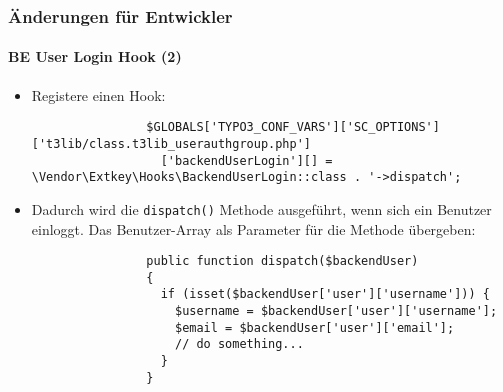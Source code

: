 \begin{frame}[fragile]
	\frametitle{Änderungen für Entwickler}
	\framesubtitle{BE User Login Hook (2)}

	\lstset{basicstyle=\tiny\ttfamily}

	\begin{itemize}
		\item Registere einen Hook:

			\begin{lstlisting}
				$GLOBALS['TYPO3_CONF_VARS']['SC_OPTIONS']['t3lib/class.t3lib_userauthgroup.php']
				  ['backendUserLogin'][] = \Vendor\Extkey\Hooks\BackendUserLogin::class . '->dispatch';
			\end{lstlisting}

		\item Dadurch wird die \texttt{dispatch()} Methode ausgeführt, wenn sich ein Benutzer einloggt.
			Das Benutzer-Array als Parameter für die Methode übergeben:

			\begin{lstlisting}
				public function dispatch($backendUser)
				{
				  if (isset($backendUser['user']['username'])) {
				    $username = $backendUser['user']['username'];
				    $email = $backendUser['user']['email'];
				    // do something...
				  }
				}
			\end{lstlisting}

	\end{itemize}

\end{frame}

